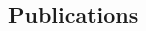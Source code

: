 \documentclass[margin,line,letterpaper]{resume}
\begin{document}
\begin{resume}
\begin{small}
    \section{\mysidestyle Publications}

\newcommand\blfootnote[1]{%
  \begingroup
  \renewcommand\thefootnote{}\footnote{#1}%
  \addtocounter{footnote}{-1}%
  \endgroup
}
    

\begin{footnotesize}
\vspace{-10pt}
\begin{spacing}{-1}

\end{spacing}
\end{footnotesize}

%
%

\end{small}
\end{resume}
\end{document}
